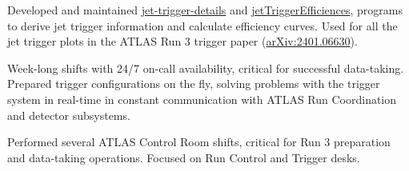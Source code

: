 
\begin{cventries}
    {Developed and maintained \href{https://gitlab.cern.ch/atlas-trigger/jet/jet-trigger-details}{jet-trigger-details} and \href{https://gitlab.cern.ch/atlas-trigger/jet/jetTriggerEfficiencies/-/tree/R22-master}{jetTriggerEfficiences}, programs to derive jet trigger information and calculate efficiency curves. Used for all the jet trigger plots in the ATLAS Run 3 trigger paper (\href{https://doi.org/10.48550/arXiv.2401.06630}{arXiv:2401.06630}).}

    {Week-long shifts with 24/7 on-call availability, critical for successful data-taking. Prepared trigger configurations on the fly, solving problems with the trigger system in real-time in constant communication with ATLAS Run Coordination and detector subsystems.}

    {Performed several ATLAS Control Room shifts, critical for Run 3 preparation and data-taking operations. Focused on Run Control and Trigger desks.}

\end{cventries}